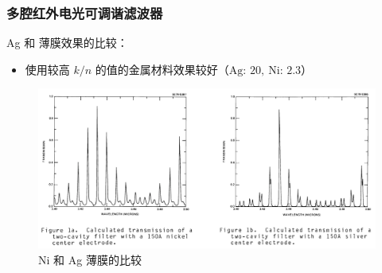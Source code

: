 \begin{frame}[c]
    \frametitle{多腔红外电光可调谐滤波器}
    \textrm{Ag} 和  薄膜效果的比较：
    \begin{itemize}
        \item 使用较高 $k/n$ 的值的金属材料效果较好（$\text{Ag: }20,\ \text{Ni: }2.3$）
    \end{itemize}

    \begin{figure}[H] %
        \centering %
        \includegraphics[width=1.\textwidth]{figures/Multiple-Cavity Infrared Electro-Optic Tunable Filter_1.png} %
        \caption{$\mathrm{Ni}$ 和 \textrm{Ag} 薄膜的比较}
    \end{figure}
\end{frame}